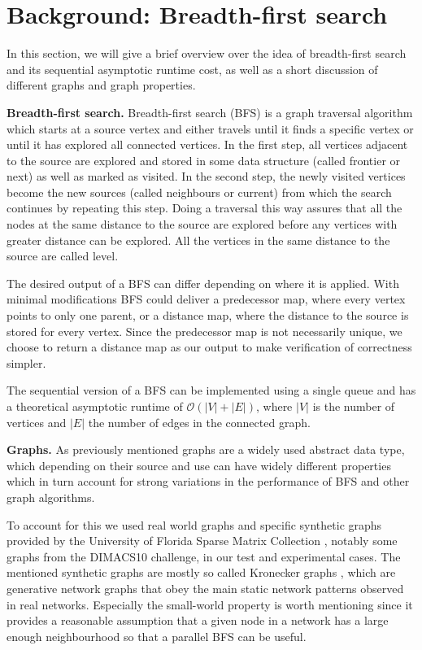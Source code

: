 \documentclass[letterpaper]{article}
\newcommand{\mypar}[1]{{\bf #1.}} %
\begin{document}
	\section{Background: Breadth-first search}\label{sec:background} %
		
	In this section, we will give a brief overview over the idea of breadth-first search and its sequential asymptotic runtime cost, as well as a short discussion of different graphs and graph properties. 
	
	
	\mypar{Breadth-first search}
	Breadth-first search (BFS) is a graph traversal algorithm which starts at a source vertex and either travels until it finds a specific vertex or until it has explored all connected vertices. 
	In the first step, all vertices adjacent to the source are explored and stored in some data structure (called frontier or next) as well as marked as visited. 
	In the second step, the newly visited vertices become the new sources (called neighbours or current) from which the search continues by repeating this step. 
	Doing a traversal this way assures that all the nodes at the same distance to the source are explored before any vertices with greater distance can be explored. 
	All the vertices in the same distance to the source are called level.
	
	The desired output of a BFS can differ depending on where it is applied. With minimal modifications BFS could deliver a predecessor map, where every vertex points to only one parent, or a distance map, where the distance to the source is stored for every vertex. Since the predecessor map is not necessarily unique, we choose to return a distance map as our output to make verification of correctness simpler.  
	
	The sequential version of a BFS can be implemented using a single queue and has a theoretical asymptotic runtime of $\mathcal{O}(\lvert V\rvert + \lvert E\rvert )$, where $\lvert V\rvert$ is the number of vertices and $\lvert E\rvert$ the number of edges in the connected graph.
	
	
	\mypar{Graphs}
	As previously mentioned graphs are a widely used abstract data type, which depending on their source and use can have widely different properties which in turn account for strong variations in the performance of BFS and other graph algorithms.
	
	To account for this we used real world graphs and specific synthetic graphs provided by the University of Florida Sparse Matrix Collection \cite{SparseMatrixCollection}, notably some graphs from the DIMACS10 challenge, in our test and experimental cases.
	The mentioned synthetic graphs are mostly so called Kronecker graphs \cite{Leskovec:2010:KGA:1756006.1756039}, which are generative network graphs that obey the main static network patterns observed in real networks.
	Especially the small-world property is worth mentioning since it provides a reasonable assumption that a given node in a network has a large enough neighbourhood so that a parallel BFS can be useful.	
	
\end{document}
